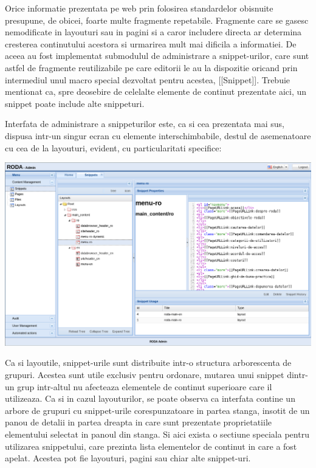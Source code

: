 Orice informatie prezentata pe web prin folosirea standardelor obisnuite
presupune, de obicei, foarte multe fragmente repetabile. Fragmente
care se gasesc nemodificate in layouturi sau in pagini si a caror
includere directa ar determina cresterea continutului acestora si
urmarirea mult mai dificila a informatiei. De aceea au fost implementat
submodulul de administrare a snippet-urilor, care sunt astfel de fragmente
reutilizabile pe care editorii le au la dispozitie oricand prin intermediul
unul macro special dezvoltat pentru acestea, {[}{[}Snippet{]}{]}.
Trebuie mentionat ca, spre deosebire de celelalte elemente de continut
prezentate aici, un snippet poate include alte snippeturi.

Interfata de administrare a snippeturilor este, ca si cea prezentata
mai sus, dispusa intr-un singur ecran cu elemente interschimbabile,
destul de asemenatoare cu cea de la layouturi, evident, cu particularitati
specifice:

\includegraphics[width=15cm]{cms/backend/snippet/snippet1}

Ca si layoutile, snippet-urile sunt distribuite intr-o structura arborescenta
de grupuri. Acestea sunt utile exclusiv pentru ordonare, mutarea unui
snippet dintr-un grup intr-altul nu afecteaza elementele de continut
superioare care il utilizeaza. Ca si in cazul layouturilor, se poate
observa ca interfata contine un arbore de grupuri cu snippet-urile
corespunzatoare in partea stanga, insotit de un panou de detalii in
partea dreapta in care sunt prezentate proprietatiile elementului
selectat in panoul din stanga. Si aici exista o sectiune speciala
pentru utilizarea snippetului, care prezinta lista elementelor de
continut in care a fost apelat. Acestea pot fie layouturi, pagini
sau chiar alte snippet-uri.

